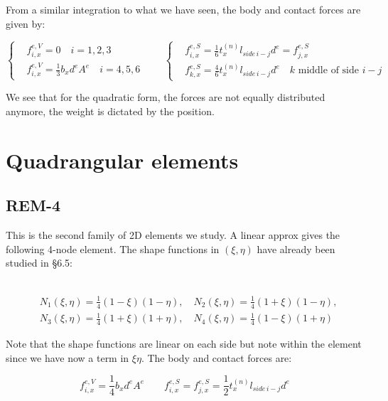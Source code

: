 	From a similar integration to what we have seen, the body and contact forces are given by:
	
	\begin{equation}
	\left\{
	\begin{aligned}
	&f_{i,x}^{e,V} = 0 \quad i = 1,2,3\\
	&f_{i,x}^{e,V} = \frac{1}{3}b_x d^eA^e \quad i = 4,5,6
	\end{aligned}
	\right.
	\qquad 
	\left\{
	\begin{aligned}
	&f_{i,x}^{e,S} = \frac{1}{6}t^{(n)}_x l_{side \, i-j} d^e = f_{j,x}^{e,S} \\
	&f_{k,x}^{e,S} = \frac{4}{6} t_x^{(n)} l_{side \, i-j}d^e \quad k \mbox{ middle of side } i-j
	\end{aligned}
	\right.
	\end{equation}
	
	We see that for the quadratic form, the forces are not equally distributed anymore, the weight is dictated by the position. 
	
\section{Quadrangular elements}
\subsection{REM-4}
	This is the second family of 2D elements we study. A linear approx gives the following 4-node element. The shape functions in $(\xi, \eta)$ have already been studied in §6.5: 
	
	\ \\
	
	\begin{equation}
	\begin{aligned}
	&N_1(\xi , \eta) = \frac{1}{4} (1-\xi)(1-\eta), \quad N_2(\xi , \eta) = \frac{1}{4} (1+\xi)(1-\eta), \\ 
	&N_3(\xi , \eta) = \frac{1}{4} (1+\xi)(1+\eta), \quad N_4(\xi , \eta) = \frac{1}{4} (1-\xi)(1+\eta)
	\end{aligned}
	\end{equation}
	
	Note that the shape functions are linear on each side but note within the element since we have now a term in $\xi \eta$. The body and contact forces are:
	
	\begin{equation}
	f_{i,x}^{e,V} = \frac{1}{4} b_x d^eA^e \qquad f_{i,x}^{e,S} = f_{j,x}^{e,S} = \frac{1}{2} t_x^{(n)} l_{side \, i-j}d^e
	\end{equation}
	
